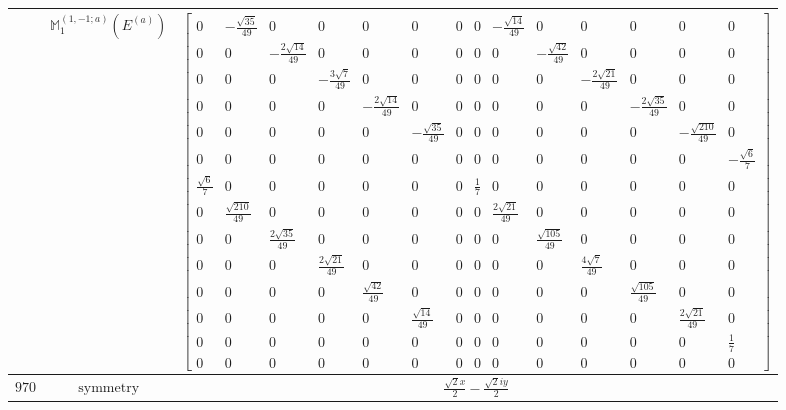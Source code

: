 \documentclass[fleqn,8pt,landscape]{jsarticle}
\begin{document}
\begin{longtable}{ccc}
$  $ & $ \mathbb{M}_{1}^{(1,-1;a)}(E^{(a)}) $ & $ \begin{bmatrix} 0 & - \frac{\sqrt{35}}{49} & 0 & 0 & 0 & 0 & 0 & 0 & - \frac{\sqrt{14}}{49} & 0 & 0 & 0 & 0 & 0 \\ 0 & 0 & - \frac{2 \sqrt{14}}{49} & 0 & 0 & 0 & 0 & 0 & 0 & - \frac{\sqrt{42}}{49} & 0 & 0 & 0 & 0 \\ 0 & 0 & 0 & - \frac{3 \sqrt{7}}{49} & 0 & 0 & 0 & 0 & 0 & 0 & - \frac{2 \sqrt{21}}{49} & 0 & 0 & 0 \\ 0 & 0 & 0 & 0 & - \frac{2 \sqrt{14}}{49} & 0 & 0 & 0 & 0 & 0 & 0 & - \frac{2 \sqrt{35}}{49} & 0 & 0 \\ 0 & 0 & 0 & 0 & 0 & - \frac{\sqrt{35}}{49} & 0 & 0 & 0 & 0 & 0 & 0 & - \frac{\sqrt{210}}{49} & 0 \\ 0 & 0 & 0 & 0 & 0 & 0 & 0 & 0 & 0 & 0 & 0 & 0 & 0 & - \frac{\sqrt{6}}{7} \\ \frac{\sqrt{6}}{7} & 0 & 0 & 0 & 0 & 0 & 0 & \frac{1}{7} & 0 & 0 & 0 & 0 & 0 & 0 \\ 0 & \frac{\sqrt{210}}{49} & 0 & 0 & 0 & 0 & 0 & 0 & \frac{2 \sqrt{21}}{49} & 0 & 0 & 0 & 0 & 0 \\ 0 & 0 & \frac{2 \sqrt{35}}{49} & 0 & 0 & 0 & 0 & 0 & 0 & \frac{\sqrt{105}}{49} & 0 & 0 & 0 & 0 \\ 0 & 0 & 0 & \frac{2 \sqrt{21}}{49} & 0 & 0 & 0 & 0 & 0 & 0 & \frac{4 \sqrt{7}}{49} & 0 & 0 & 0 \\ 0 & 0 & 0 & 0 & \frac{\sqrt{42}}{49} & 0 & 0 & 0 & 0 & 0 & 0 & \frac{\sqrt{105}}{49} & 0 & 0 \\ 0 & 0 & 0 & 0 & 0 & \frac{\sqrt{14}}{49} & 0 & 0 & 0 & 0 & 0 & 0 & \frac{2 \sqrt{21}}{49} & 0 \\ 0 & 0 & 0 & 0 & 0 & 0 & 0 & 0 & 0 & 0 & 0 & 0 & 0 & \frac{1}{7} \\ 0 & 0 & 0 & 0 & 0 & 0 & 0 & 0 & 0 & 0 & 0 & 0 & 0 & 0 \end{bmatrix} $ \\ \hline
$ 970 $ & $ \text{symmetry} $ & $ \frac{\sqrt{2} x}{2} - \frac{\sqrt{2} i y}{2} $ \\

\end{longtable}
\end{document}
